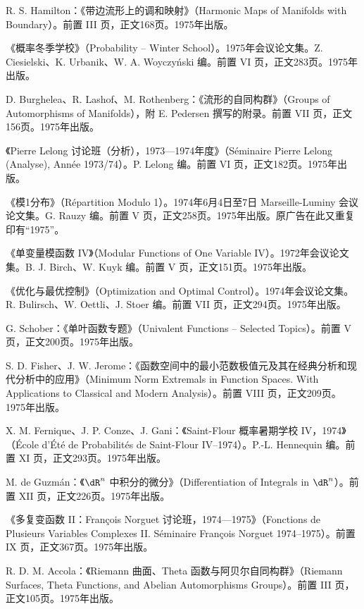 \begin{description}[style=nextline,leftmargin=1.5em,itemsep=7pt]
\item[第471卷] R. S. Hamilton：《带边流形上的调和映射》（Harmonic Maps of Manifolds with Boundary）。前置 III 页，正文168页。1975年出版。
\item[第472卷]《概率冬季学校》（Probability -- Winter School）。1975年会议论文集。Z. Ciesielski、K. Urbanik、W. A. Woyczyński 编。前置 VI 页，正文283页。1975年出版。
\item[第473卷] D. Burghelea、R. Lashof、M. Rothenberg：《流形的自同构群》（Groups of Automorphisms of Manifolds），附 E. Pedersen 撰写的附录。前置 VII 页，正文156页。1975年出版。
\item[第474卷]《Pierre Lelong 讨论班（分析），1973—1974年度》（Séminaire Pierre Lelong (Analyse), Année 1973/74）。P. Lelong 编。前置 VI 页，正文182页。1975年出版。
\item[第475卷]《模1分布》（Répartition Modulo 1）。1974年6月4日至7日 Marseille-Luminy 会议论文集。G. Rauzy 编。前置 V 页，正文258页。1975年出版。原广告在此又重复印有“1975”。
\item[第476卷]《单变量模函数 IV》（Modular Functions of One Variable IV）。1972年会议论文集。B. J. Birch、W. Kuyk 编。前置 V 页，正文151页。1975年出版。
\item[第477卷]《优化与最优控制》（Optimization and Optimal Control）。1974年会议论文集。R. Bulirsch、W. Oettli、J. Stoer 编。前置 VII 页，正文294页。1975年出版。
\item[第478卷] G. Schober：《单叶函数专题》（Univalent Functions -- Selected Topics）。前置 V 页，正文200页。1975年出版。
\item[第479卷] S. D. Fisher、J. W. Jerome：《函数空间中的最小范数极值元及其在经典分析和现代分析中的应用》（Minimum Norm Extremals in Function Spaces. With Applications to Classical and Modern Analysis）。前置 VIII 页，正文209页。1975年出版。
\item[第480卷] X. M. Fernique、J. P. Conze、J. Gani：《Saint-Flour 概率暑期学校 IV，1974》（École d'Été de Probabilités de Saint-Flour IV--1974）。P.-L. Hennequin 编。前置 XI 页，正文293页。1975年出版。
\item[第481卷] M. de Guzmán：《$\dR^n$ 中积分的微分》（Differentiation of Integrals in $\dR^n$）。前置 XII 页，正文226页。1975年出版。
\item[第482卷]《多复变函数 II：François Norguet 讨论班，1974—1975》（Fonctions de Plusieurs Variables Complexes II. Séminaire François Norguet 1974--1975）。前置 IX 页，正文367页。1975年出版。
\item[第483卷] R. D. M. Accola：《Riemann 曲面、Theta 函数与阿贝尔自同构群》（Riemann Surfaces, Theta Functions, and Abelian Automorphisms Groups）。前置 III 页，正文105页。1975年出版。

\end{description}
